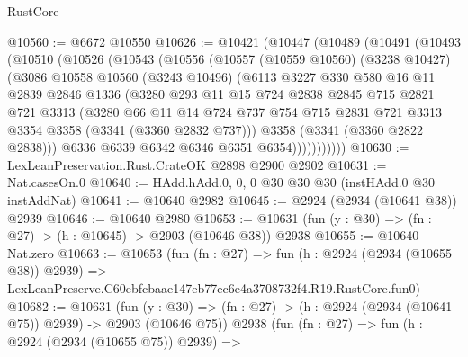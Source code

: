 \begin{lexlean}{RustCore}
\begin{coremodule}
@10560 := @6672 @10550
@10626 := @10421
    (@10447
      (@10489
        (@10491
          (@10493
            (@10510
              (@10526
                (@10543
                  (@10556
                    (@10557
                      (@10559 @10560)
                      (@3238 @10427)
                      (@3086
                        @10558
                        @10560
                        (@3243 @10496)
                        (@6113
                          @3227
                          @330
                          @580
                          @16
                          @11
                          @2839
                          @2846
                          @1336
                          (@3280
                            @293
                            @11
                            @15
                            @724
                            @2838
                            @2845
                            @715
                            @2821
                            @721
                            @3313
                            (@3280
                              @66
                              @11
                              @14
                              @724
                              @737
                              @754
                              @715
                              @2831
                              @721
                              @3313
                              @3354
                              @3358
                              (@3341 (@3360 @2832 @737)))
                            @3358
                            (@3341 (@3360 @2822 @2838)))
                          @6336
                          @6339
                          @6342
                          @6346
                          @6351
                          @6354)))))))))))
@10630 := LexLeanPreservation.Rust.CrateOK @2898 @2900 @2902
@10631 := Nat.casesOn.{0}
@10640 := HAdd.hAdd.{0, 0, 0} @30 @30 @30 (instHAdd.{0} @30 instAddNat)
@10641 := @10640 @2982
@10645 := @2924 (@2934 (@10641 @38)) @2939
@10646 := @10640 @2980
@10653 := @10631 (fun (y : @30) => (fn : @27) -> (h : @10645) -> @2903 (@10646 @38)) @2938
@10655 := @10640 Nat.zero
@10663 := @10653
    (fun (fn : @27) =>
    fun (h : @2924 (@2934 (@10655 @38)) @2939) =>
    LexLeanPreserve.C60ebfcbaae147eb77ec6e4a3708732f4.R19.RustCore.fun0)
@10682 := @10631
    (fun (y : @30) => (fn : @27) -> (h : @2924 (@2934 (@10641 @75)) @2939) -> @2903 (@10646 @75))
    @2938
    (fun (fn : @27) =>
    fun (h : @2924 (@2934 (@10655 @75)) @2939) =>

\end{coremodule}
\end{lexlean}
